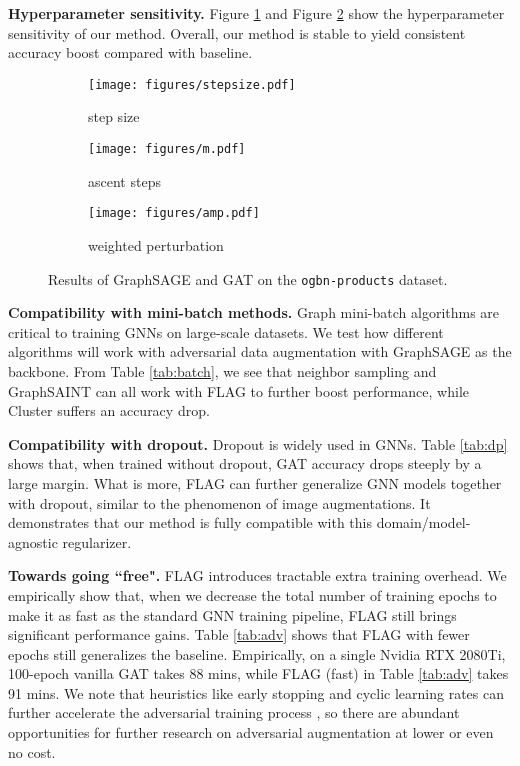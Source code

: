 \documentclass[11pt]{article}
\begin{document}
\textbf{Hyperparameter sensitivity.} Figure \ref{fig:ablate1} and Figure \ref{fig:ablate2} show the hyperparameter sensitivity of our method. Overall, our method is stable to yield consistent accuracy boost compared with baseline. 









\begin{figure*}[th]\centering
    \begin{subfigure}{.3\textwidth}
        \texttt{[image: figures/stepsize.pdf]} 
        \caption{step size}
        \label{fig:ablate1}
    \end{subfigure}\begin{subfigure}{.3\textwidth}
        \texttt{[image: figures/m.pdf]}\caption{ascent steps}
        \label{fig:ablate2}
    \end{subfigure}\begin{subfigure}{.3\textwidth}
        \texttt{[image: figures/amp.pdf]}\caption{weighted perturbation}
        \label{fig:biased}
    \end{subfigure}
    \caption{Results of GraphSAGE and GAT on the \texttt{ogbn-products} dataset.}\end{figure*}



{\bf Compatibility with mini-batch methods.} Graph mini-batch algorithms are critical to training GNNs on large-scale datasets. We test how different algorithms will work with adversarial data augmentation with GraphSAGE as the backbone. From Table \ref{tab:batch}, we see that neighbor sampling \citep{hamilton2017inductive} and GraphSAINT \citep{zeng2019graphsaint} can all work with FLAG to further boost performance, while Cluster \citep{chiang2019cluster} suffers an accuracy drop. 





{\bf Compatibility with dropout.} Dropout is widely used in GNNs. Table \ref{tab:dp} shows that, when trained without dropout, GAT accuracy drops steeply by a large margin. What is more, FLAG can further generalize GNN models together with dropout, similar to the phenomenon of image augmentations. It demonstrates that our method is fully compatible with this domain/model-agnostic regularizer.


{\bf Towards going ``free".} FLAG introduces tractable extra training overhead.  We empirically show that, when we decrease the total number of training epochs to make it as fast as the standard GNN training pipeline, FLAG still brings significant performance gains. Table \ref{tab:adv} shows that FLAG with fewer epochs still generalizes the baseline. Empirically, on a single Nvidia RTX 2080Ti, 100-epoch vanilla GAT takes 88 mins, while FLAG (fast) in Table \ref{tab:adv} takes 91 mins. We note that heuristics like early stopping and cyclic learning rates can further accelerate the adversarial training process \citep{wong2020fast}, so there are abundant opportunities for further research on adversarial augmentation at lower or even no cost.
\end{document}
